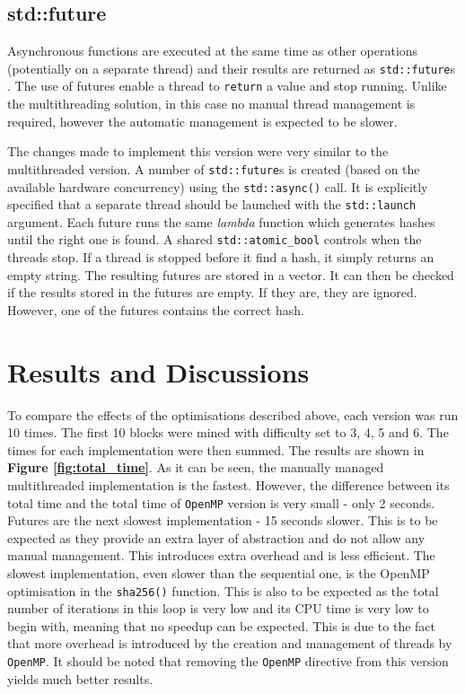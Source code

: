 \documentclass[12pt, a4paper]{article}
\begin{document}
    \subsection{std::future}
    Asynchronous functions are executed at the same time as other operations (potentially on a separate thread) and their results are returned as \texttt{std::future}s \cite{futurec++}. The use of futures enable a thread to \texttt{return} a value and stop running. Unlike the multithreading solution, in this case no manual thread management is required, however the automatic management is expected to be slower.

    The changes made to implement this version were very similar to the multithreaded version. A number of \texttt{std::future}s is created (based on the available hardware concurrency) using the \texttt{std::async()} call. It is explicitly specified that a separate thread should be launched with the \texttt{std::launch} argument. Each future runs the same \textit{lambda} function which generates hashes until the right one is found. A shared \texttt{std::atomic\_bool} controls when the threads stop. If a thread is stopped before it find a hash, it simply returns an empty string. The resulting futures are stored in a vector. It can then be checked if the results stored in the futures are empty. If they are, they are ignored. However, one of the futures contains the correct hash.

    \section{Results and Discussions}
    To compare the effects of the optimisations described above, each version was run 10 times. The first 10 blocks were mined with difficulty set to 3, 4, 5 and 6. The times for each implementation were then summed. The results are shown in \textbf{Figure \ref{fig:total_time}}. As it can be seen, the manually managed multithreaded implementation is the fastest. However, the difference between its total time and the total time of \texttt{OpenMP} version is very small - only 2 seconds. Futures are the next slowest implementation - 15 seconds slower. This is to be expected as they provide an extra layer of abstraction and do not allow any manual management. This introduces extra overhead and is less efficient. The slowest implementation, even slower than the sequential one, is the OpenMP optimisation in the \texttt{sha256()} function. This is also to be expected as the total number of iterations in this loop is very low and its CPU time is very low to begin with, meaning that no speedup can be expected. This is due to the fact that more overhead is introduced by the creation and management of threads by \texttt{OpenMP}. It should be noted that removing the \texttt{OpenMP} directive from this version yields much better results. 
\end{document}
